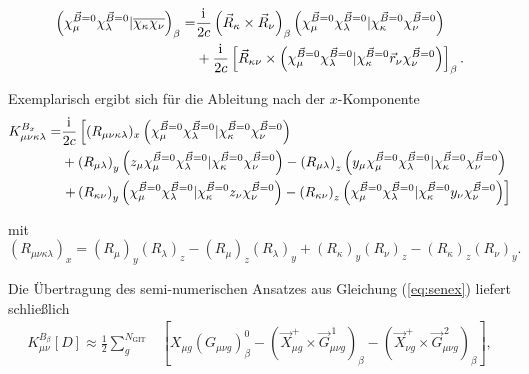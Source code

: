 	\begin{equation}
	\begin{aligned}
	\left(\chi_\mu^{\vec{B}=0}\chi_\lambda^{\vec{B}=0}\vert\overline{\chi_\kappa\chi_\nu}\right)_\beta=&\frac{\mathrm{i}\mkern1mu}{2c}\left(\vec{R}_\kappa\times\vec{R}_\nu\right)_\beta\left(\chi_\mu^{\vec{B}=0}\chi_\lambda^{\vec{B}=0}\vert\chi_\kappa^{\vec{B}=0}\chi_\nu^{\vec{B}=0}\right)\\
	&+\frac{\mathrm{i}\mkern1mu}{2c}\left[\vec{R}_{\kappa\nu}\times\left(\chi_\mu^{\vec{B}=0}\chi_\lambda^{\vec{B}=0}\vert\chi_\kappa^{\vec{B}=0}\vec{r}_\nu\chi_\nu^{\vec{B}=0}\right)\right]_\beta.
	\end{aligned}
	\end{equation}

Exemplarisch ergibt sich für die Ableitung nach der $x$-Komponente 	
	\begin{equation}
	\begin{aligned}
	K_{\mu\nu\kappa\lambda}^{B_x}=&\frac{\mathrm{i}\mkern1mu}{2c}\left[(R_{\mu\nu\kappa\lambda})_x\left(\chi_\mu^{\vec{B}=0}\chi_\lambda^{\vec{B}=0}\vert\chi_\kappa^{\vec{B}=0}\chi_\nu^{\vec{B}=0}\right)\right.\\
	&+\left(R_{\mu\lambda}\right)_y\left(z_\mu\chi_\mu^{\vec{B}=0}\chi_\lambda^{\vec{B}=0}\vert\chi_\kappa^{\vec{B}=0}\chi_\nu^{\vec{B}=0}\right)-\left(R_{\mu\lambda}\right)_z\left(y_\mu\chi_\mu^{\vec{B}=0}\chi_\lambda^{\vec{B}=0}\vert\chi_\kappa^{\vec{B}=0}\chi_\nu^{\vec{B}=0}\right)\\
	&\left.+\left(R_{\kappa\nu}\right)_y\left(\chi_\mu^{\vec{B}=0}\chi_\lambda^{\vec{B}=0}\vert\chi_\kappa^{\vec{B}=0}z_\nu\chi_\nu^{\vec{B}=0}\right)-\left(R_{\kappa\nu}\right)_z\left(\chi_\mu^{\vec{B}=0}\chi_\lambda^{\vec{B}=0}\vert\chi_\kappa^{\vec{B}=0}y_\nu\chi_\nu^{\vec{B}=0}\right)\right]
	\end{aligned}
	\end{equation}
	
	mit
	\begin{equation}
	(R_{\mu\nu\kappa\lambda})_x=(R_\mu)_y(R_\lambda)_z-(R_\mu)_z(R_\lambda)_y+(R_\kappa)_y(R_\nu)_z-(R_\kappa)_z(R_\nu)_y.
	\end{equation}	
	
	Die Übertragung des semi-numerischen Ansatzes aus Gleichung (\ref{eq:senex}) liefert schließlich
	\begin{equation}
	\begin{aligned}
	K_{\mu\nu}^{B_\beta}[D]\approx\frac{1}{2}\sum_{g}^{N_{\textrm{GIT}}}&\left[X_{\mu g}(G_{\mu\nu g})_\beta^0-\left(\vec{X}_{\mu g}^+\times\vec{G}_{\mu\nu g}^{\,1}\right)_\beta-\left(\vec{X}_{\nu g}^+\times\vec{G}_{\mu\nu g}^{\,2}\right)_\beta\right],
	\end{aligned}
	\end{equation}
	
